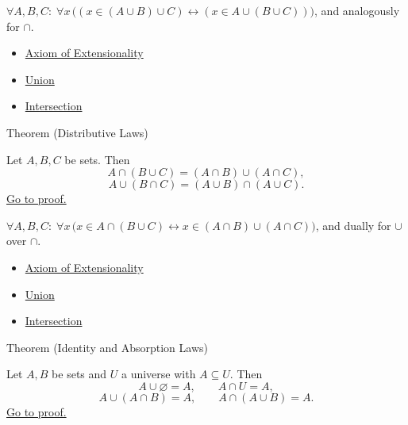 \begin{remark*}
$\forall A, B, C:\; \forall x\,\bigl((x \in (A \cup B) \cup C) \leftrightarrow (x \in A \cup (B \cup C))\bigr)$, and analogously for $\cap$.
\end{remark*}

\begin{dependencies}
\begin{itemize}
  \item \hyperref[ax:extensionality]{Axiom of Extensionality}
  \item \hyperref[def:union]{Union}
  \item \hyperref[def:intersection]{Intersection}
\end{itemize}
\end{dependencies}

\begin{theorembox}{Theorem (Distributive Laws)}
\begin{theorem}\label{thm:distributivity}
Let $A,B,C$ be sets. Then
\[
A \cap (B \cup C) = (A \cap B) \cup (A \cap C),
\]
\[
A \cup (B \cap C) = (A \cup B) \cap (A \cup C).
\]
\hyperref[prf:distributivity]{Go to proof.}
\end{theorem}
\end{theorembox}

\begin{remark*}
$\forall A, B, C:\; \forall x\,\bigl(x \in A \cap (B \cup C) \leftrightarrow x \in (A \cap B) \cup (A \cap C)\bigr)$, and dually for $\cup$ over $\cap$.
\end{remark*}

\begin{dependencies}
\begin{itemize}
  \item \hyperref[ax:extensionality]{Axiom of Extensionality}
  \item \hyperref[def:union]{Union}
  \item \hyperref[def:intersection]{Intersection}
\end{itemize}
\end{dependencies}

\begin{theorembox}{Theorem (Identity and Absorption Laws)}
\begin{theorem}\label{thm:identity-absorption}
Let $A,B$ be sets and $U$ a universe with $A \subseteq U$. Then
\[
A \cup \varnothing = A,
\qquad
A \cap U = A,
\]
\[
A \cup (A \cap B) = A,
\qquad
A \cap (A \cup B) = A.
\]
\hyperref[prf:identity-absorption]{Go to proof.}
\end{theorem}
\end{theorembox}

